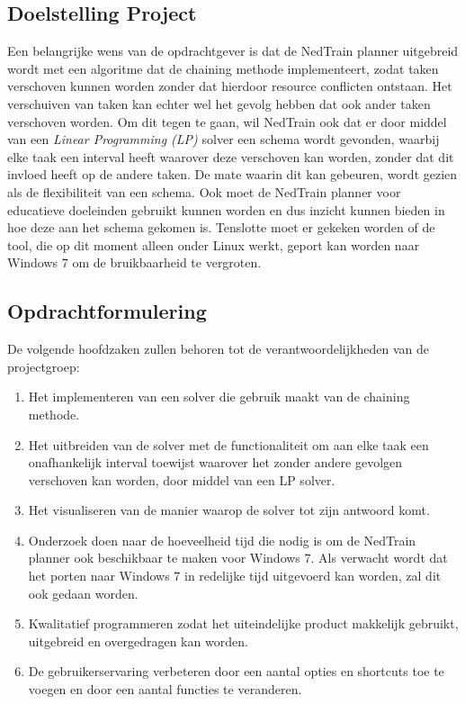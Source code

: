 \subsection{Doelstelling Project}
Een belangrijke wens van de opdrachtgever is dat de NedTrain planner uitgebreid wordt met een algoritme dat de chaining methode implementeert, zodat taken verschoven kunnen worden zonder dat hierdoor resource conflicten ontstaan. Het verschuiven van taken kan echter wel het gevolg hebben dat ook ander taken verschoven worden. Om dit tegen te gaan, wil NedTrain ook dat er door middel van een \emph{Linear Programming (LP)} solver een schema wordt gevonden, waarbij elke taak een interval heeft waarover deze verschoven kan worden, zonder dat dit invloed heeft op de andere taken. De mate waarin dit kan gebeuren, wordt gezien als de flexibiliteit van een schema. Ook moet de NedTrain planner voor educatieve doeleinden gebruikt kunnen worden en dus inzicht kunnen bieden in hoe deze aan het schema gekomen is. Tenslotte moet er gekeken worden of de tool, die op dit moment alleen onder Linux werkt, geport kan worden naar Windows 7 om de bruikbaarheid te vergroten.

\subsection{Opdrachtformulering}
\label{subsec:opdrachtformulering}
De volgende hoofdzaken zullen behoren tot de verantwoordelijkheden van de projectgroep:
\begin{enumerate}
	\item \label{enum:chaining} Het implementeren van een solver die gebruik maakt van de chaining methode.
	\item \label{enum:LP} Het uitbreiden van de solver met de functionaliteit om aan elke taak een onafhankelijk interval toewijst waarover het zonder andere gevolgen verschoven kan worden, door middel van een LP solver.
	\item \label{enum:visueel} Het visualiseren van de manier waarop de solver tot zijn antwoord komt.
	\item \label{enum:windows} Onderzoek doen naar de hoeveelheid tijd die nodig is om de NedTrain planner ook beschikbaar te maken voor Windows 7. Als verwacht wordt dat het porten naar Windows 7 in redelijke tijd uitgevoerd kan worden, zal dit ook gedaan worden. 
	\item \label{enum:kwaliteit} Kwalitatief programmeren zodat het uiteindelijke product makkelijk gebruikt, uitgebreid en overgedragen kan worden.
	\item \label{enum:gebruiker} De gebruikerservaring verbeteren door een aantal opties en shortcuts toe te voegen en door een aantal functies te veranderen.
\end{enumerate}

